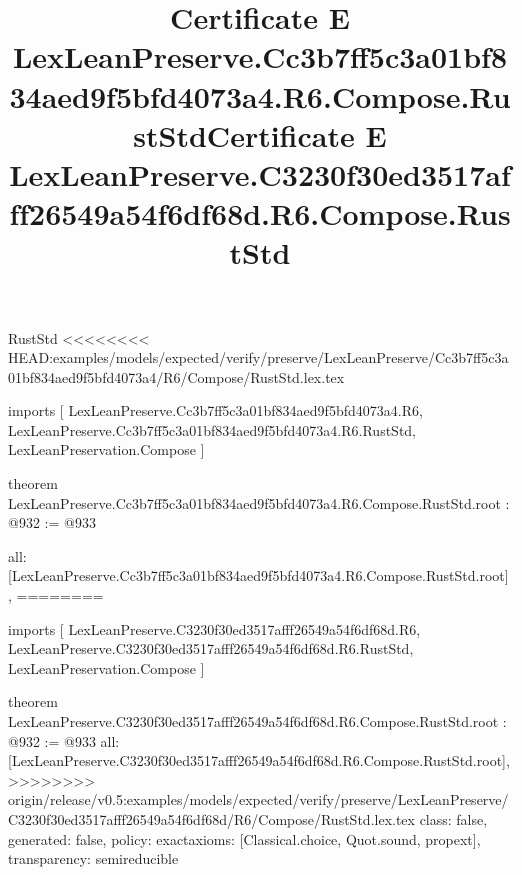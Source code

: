 \begin{lexlean}{RustStd}
<<<<<<<< HEAD:examples/models/expected/verify/preserve/LexLeanPreserve/Cc3b7ff5c3a01bf834aed9f5bfd4073a4/R6/Compose/RustStd.lex.tex
\title{Certificate E LexLeanPreserve.Cc3b7ff5c3a01bf834aed9f5bfd4073a4.R6.Compose.RustStd}
\begin{coremodule}
imports [
  LexLeanPreserve.Cc3b7ff5c3a01bf834aed9f5bfd4073a4.R6,
  LexLeanPreserve.Cc3b7ff5c3a01bf834aed9f5bfd4073a4.R6.RustStd,
  LexLeanPreservation.Compose
]

theorem LexLeanPreserve.Cc3b7ff5c3a01bf834aed9f5bfd4073a4.R6.Compose.RustStd.root : @932 := @933 {
  all: [LexLeanPreserve.Cc3b7ff5c3a01bf834aed9f5bfd4073a4.R6.Compose.RustStd.root],
========
\title{Certificate E LexLeanPreserve.C3230f30ed3517afff26549a54f6df68d.R6.Compose.RustStd}
\begin{coremodule}
imports [
  LexLeanPreserve.C3230f30ed3517afff26549a54f6df68d.R6,
  LexLeanPreserve.C3230f30ed3517afff26549a54f6df68d.R6.RustStd,
  LexLeanPreservation.Compose
]

theorem LexLeanPreserve.C3230f30ed3517afff26549a54f6df68d.R6.Compose.RustStd.root : @932 := @933 {
  all: [LexLeanPreserve.C3230f30ed3517afff26549a54f6df68d.R6.Compose.RustStd.root],
>>>>>>>> origin/release/v0.5:examples/models/expected/verify/preserve/LexLeanPreserve/C3230f30ed3517afff26549a54f6df68d/R6/Compose/RustStd.lex.tex
  class: false,
  generated: false,
  policy: exact{axioms: [Classical.choice, Quot.sound, propext]},
  transparency: semireducible
}


\end{coremodule}}
\end{coremodule}
\end{lexlean}
